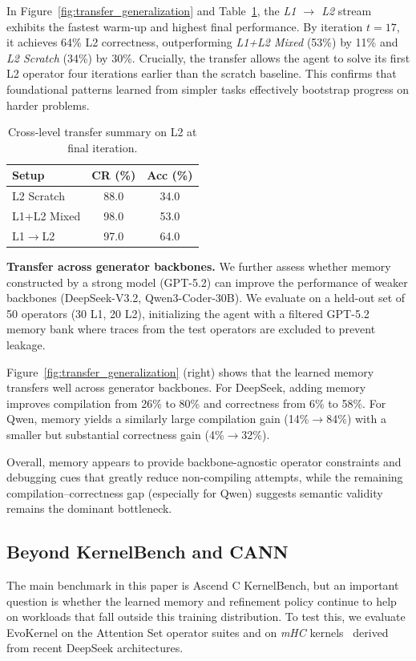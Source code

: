 \documentclass{article} %
\makeatletter
\providecommand{\FloatBarrier}{%
  \ifx\@deferlist\@empty\else\clearpage\fi}
\theoremstyle{definition}
\theoremstyle{remark}
\makeatother
\begin{document}
In Figure~\ref{fig:transfer_generalization} and Table~\ref{tab:transfer_summary}, the \emph{L1 $\rightarrow$ L2} stream exhibits the fastest warm-up and highest final performance. By iteration $t=17$, it achieves 64\% L2 correctness, outperforming \emph{L1+L2 Mixed} (53\%) by 11\% and \emph{L2 Scratch} (34\%) by 30\%. Crucially, the transfer allows the agent to solve its first L2 operator four iterations earlier than the scratch baseline. This confirms that foundational patterns learned from simpler tasks effectively bootstrap progress on harder problems.

\begin{table}[ht]
\centering
\caption{Cross-level transfer summary on L2 at final iteration.}
\label{tab:transfer_summary}
\setlength{\tabcolsep}{12pt}
\begin{tabular}{lcc}
\toprule
\textbf{Setup} & \textbf{CR (\%)} & \textbf{Acc (\%)} \\
\midrule
L2 Scratch & 88.0 & 34.0 \\
L1+L2 Mixed & 98.0 & 53.0 \\
L1$\rightarrow$L2 & 97.0 & 64.0 \\
\bottomrule
\end{tabular}
\end{table}

\textbf{Transfer across generator backbones.}
We further assess whether memory constructed by a strong model (GPT-5.2) can improve the performance of weaker backbones (DeepSeek-V3.2, Qwen3-Coder-30B). We evaluate on a held-out set of 50 operators (30 L1, 20 L2), initializing the agent with a filtered GPT-5.2 memory bank where traces from the test operators are excluded to prevent leakage.

Figure~\ref{fig:transfer_generalization} (right) shows that the learned memory transfers well across generator backbones.
For DeepSeek, adding memory improves compilation from 26\% to 80\% and correctness from 6\% to 58\%.
For Qwen, memory yields a similarly large compilation gain (14\%$\rightarrow$84\%) with a smaller but substantial correctness gain (4\%$\rightarrow$32\%).

Overall, memory appears to provide backbone-agnostic operator constraints and debugging cues that greatly reduce non-compiling attempts, while the remaining compilation--correctness gap (especially for Qwen) suggests semantic validity remains the dominant bottleneck.

\FloatBarrier
\subsection{Beyond KernelBench and CANN}
\label{sec:scaling_out}
The main benchmark in this paper is Ascend C KernelBench, but an important question is whether the learned memory and refinement policy continue to help on workloads that fall outside this training distribution. To test this, we evaluate EvoKernel on the Attention Set operator suites and on \emph{mHC} kernels~\citep{xie2025mhc} derived from recent DeepSeek architectures.
\end{document}
